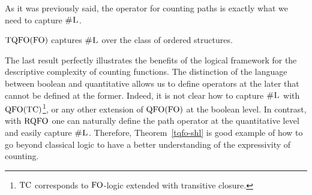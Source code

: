 As it was previously said, the operator for counting paths is exactly what we need to capture $\text{\sc \#L}$.
\begin{theorem} \label{tqfo-shl}
	${\rm TQFO}({\rm FO})$ captures $\text{\sc \#L}$ over the class of ordered structures.
\end{theorem}
The last result perfectly illustrates the benefits of the logical framework for the descriptive complexity of counting functions. 
The distinction of the language between boolean and quantitative allows us to define operators at the later that cannot be defined at the former. 
Indeed, it is not clear how to capture $\text{\sc \#L}$ with ${\rm QFO}({\rm TC})$\footnote{${\rm TC}$ corresponds to ${\rm FO}$-logic extended with transitive closure.}, or any other extension of ${\rm QFO}({\rm FO})$ at the boolean level.
In contrast, with ${\rm RQFO}$ one can naturally define the path operator at the quantitative level and easily capture $\text{\sc \#L}$.
Therefore, Theorem~\ref{tqfo-shl} is good example of how to go beyond classical logic to have a better understanding of the expressivity of counting.

\begin{comment}

\begin{theorem} \label{tqso-fo-fpsace}
	$\tqso$ and $\tqso(\fo)$ captures $\fpspace$ over the class of ordered structures.
\end{theorem}

\begin{theorem} \label{tqfo-subseteq}
	$\tqfo(\fo) \subseteq \rqfo(\fo)$.
\end{theorem}
Given tuples $\bar x = (x_1, \ldots, x_\ell)$, $\bar y = (y_1, \ldots, y_\ell)$ of pairwise distinct first-order variables, define formula $\varphi_{\text{\rm lex}}(\bar x, \bar y)$ as follows:
$$
\bigvee_{i = 1}^\ell \bigg(\bigwedge_{j = 1}^{i -1} x_i = y_i\bigg) \wedge x_i < y_i.
$$
That is, $\varphi_{\text{\rm lex}}(\bar x, \bar y)$ holds if $\bar x$ is smaller than $\bar y$ in the lexicographic order on tuples with $\ell$ elements induced by the built-in order of each structure. Moreover, define formula $\varphi_{\text{\rm succ}}(\bar x, \bar y)$ as follows:
$$
\varphi_{\text{\rm lex}}(\bar x, \bar y) \wedge \neg \exists \bar z \, (\varphi_{\text{\rm lex}}(\bar x, \bar z) \wedge \varphi_{\text{\rm lex}}(\bar z, \bar y)).
$$
That is, $\varphi_{\text{\rm succ}}(\bar x, \bar y)$ holds if $\bar y$ is the successor of $\bar x$ in the lexicographic order on tuples with $\ell$ elements.
With this notation, define $\tqsos$ to be the restriction of $\tqso$ where each occurrence of the operator ${\bf path}$ is of the form:
$$
[\pth (\psi(\bar{x}, \bar{X},\bar{y}, \bar{Y}) \wedge \varphi_{\text{\rm succ}}(\bar x, \bar y))],
$$
where $\psi(\bar{x}, \bar{X},\bar{y}, \bar{Y})$ satisfies the same conditions as in grammar \eqref{eq-def-tqso}. Then we have that:
\begin{theorem} \label{tqsos-shp}
	$\tqsos(\fo)$ captures $\shp$ over the class of ordered structures.
\end{theorem}

\end{comment}

